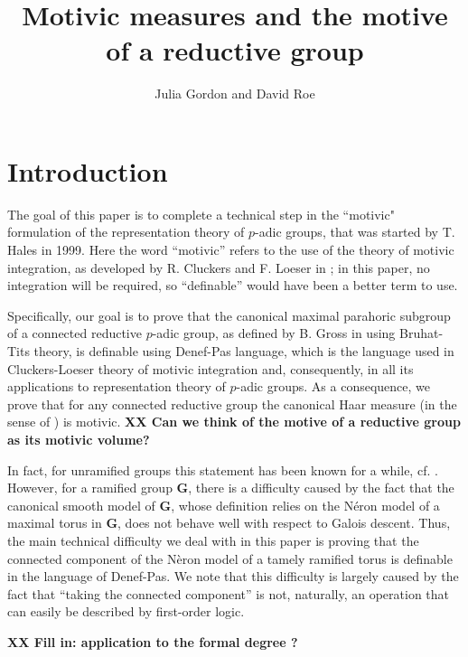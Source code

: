 \documentclass{amsart}
\title[]{Motivic measures and the motive of a reductive group}
\author{Julia Gordon and David Roe}
\newcommand{\bG}{\mathbf{G}}
\theoremstyle{plain}
\theoremstyle{definition}
\begin{document}
\maketitle

\section{Introduction}
The goal of this paper is to complete a technical step in the 
``motivic" formulation of 
the representation theory of $p$-adic groups, that was started by T. Hales in 1999. 
Here  the word ``motivic'' refers to the use of the theory of motivic integration, as developed by R. Cluckers and F. Loeser in \cite{cluckers-loeser}; in this paper, no integration will be required, so ``definable'' would have been a better term to use. 

Specifically, our goal is to prove that the canonical maximal parahoric subgroup of a connected reductive $p$-adic group, as defined by  B. Gross in \cite{gross:motive} using Bruhat-Tits theory, is definable using Denef-Pas language, which is the language used in Cluckers-Loeser theory of motivic integration and, consequently,  in all its applications to representation theory of $p$-adic groups. As a consequence, we  prove that for any connected reductive group the canonical Haar measure (in the sense of \cite{gross:motive}) is motivic.
{\bf XX Can we think of the motive of a reductive group as its motivic volume?}

In fact, for unramified groups this statement has been known for a while, cf. \cite{cluckers-hales-loeser}. However, for a ramified group $\bG$, there is a difficulty caused by the fact that the canonical smooth model of $\bG$, whose definition relies on the N\'eron model of a maximal torus in $\bG$, does not behave well with respect to Galois descent. Thus, the main technical difficulty we deal with in this paper is proving that the connected component of the N\`eron model of a tamely ramified torus is definable in the language of Denef-Pas. We note that this difficulty is largely caused by the fact that ``taking the connected component'' is not, naturally, an operation that can easily be described by first-order logic. 

{\bf XX Fill in: application to the formal degree ?}
\end{document}

